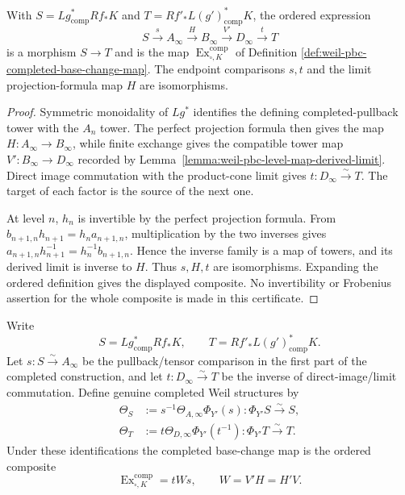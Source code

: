 \begin{lemma}
\label{lemma:weil-sf-well-defined-def-weil-pbc-completed-base-change-map}
With $S=Lg^*_{\mathrm{comp}}Rf_*K$ and
$T=Rf'_*L(g')^*_{\mathrm{comp}}K$, the ordered expression
\[
 S\xrightarrow{s}A_\infty\xrightarrow{H}B_\infty
 \xrightarrow{V'}D_\infty\xrightarrow{t}T
\]
is a morphism $S\to T$ and is the map
$\operatorname{Ex}^{\mathrm{comp}}_{\square,K}$ of Definition
\ref{def:weil-pbc-completed-base-change-map}.  The endpoint comparisons
$s,t$ and the limit projection-formula map $H$ are isomorphisms.
\end{lemma}
\begin{proof}
Symmetric monoidality of $Lg^*$ identifies the defining completed-pullback
tower with the $A_n$ tower.  The perfect projection formula then gives the
map $H:A_\infty\to B_\infty$, while finite exchange gives the compatible
tower map $V':B_\infty\to D_\infty$ recorded by
Lemma~\ref{lemma:weil-pbc-level-map-derived-limit}.  Direct image commutation
with the product-cone limit gives
$t:D_\infty\xrightarrow{\sim}T$.  The target of each factor is the source
of the next one.

At level $n$, $h_n$ is invertible by the perfect projection formula.  From
$b_{n+1,n}h_{n+1}=h_na_{n+1,n}$, multiplication by the two inverses gives
$a_{n+1,n}h_{n+1}^{-1}=h_n^{-1}b_{n+1,n}$.  Hence the inverse family is a
map of towers, and its derived limit is inverse to $H$.  Thus $s,H,t$ are
isomorphisms.  Expanding the ordered definition gives the displayed
composite.  No invertibility or Frobenius assertion for the whole composite
is made in this certificate.
\end{proof}
\begin{definition}
\label{def:weil-pbc-completed-frobenius-structures}
Write
\[
 S=Lg^*_{\mathrm{comp}}Rf_*K,
 \qquad T=Rf'_*L(g')^*_{\mathrm{comp}}K.
\]
Let $s:S\xrightarrow{\sim}A_\infty$ be the pullback/tensor comparison in the
first part of the completed construction, and let
$t:D_\infty\xrightarrow{\sim}T$ be the inverse of direct-image/limit
commutation.  Define genuine completed Weil structures by
\[
\begin{aligned}
 \Theta_S&:=s^{-1}\Theta_{A,\infty}\Phi_{Y'}(s):
 \Phi_{Y'}S\xrightarrow{\sim}S,\\
 \Theta_T&:=t\Theta_{D,\infty}\Phi_{Y'}(t^{-1}):
 \Phi_{Y'}T\xrightarrow{\sim}T.
\end{aligned}
\]
Under these identifications the completed base-change map is the ordered
composite
\[
 \operatorname{Ex}^{\mathrm{comp}}_{\square,K}=tWs,
 \qquad W=V'H=H'V.
\]
\end{definition}


